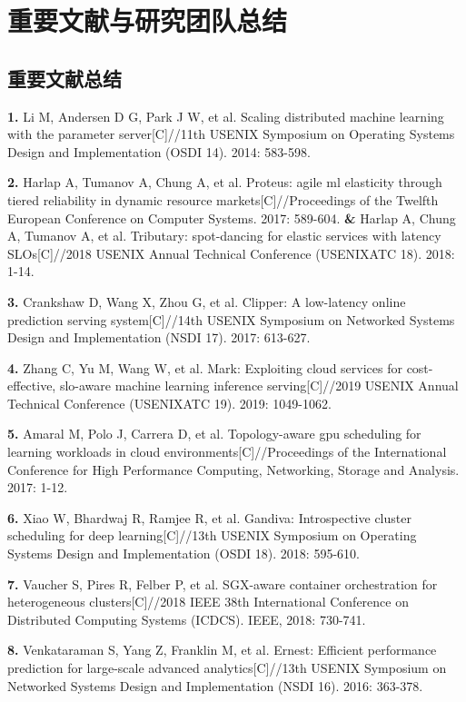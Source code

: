 \chapter{重要文献与研究团队总结}

\section{重要文献总结}
\textbf{1. }Li M, Andersen D G, Park J W, et al. Scaling distributed machine learning with the parameter server[C]//11th {USENIX} Symposium on Operating Systems Design and Implementation ({OSDI} 14). 2014: 583-598.

\textbf{2. }Harlap A, Tumanov A, Chung A, et al. Proteus: agile ml elasticity through tiered reliability in dynamic resource markets[C]//Proceedings of the Twelfth European Conference on Computer Systems. 2017: 589-604. \textbf{\&} Harlap A, Chung A, Tumanov A, et al. Tributary: spot-dancing for elastic services with latency SLOs[C]//2018 {USENIX} Annual Technical Conference ({USENIX}{ATC} 18). 2018: 1-14.

\textbf{3. }Crankshaw D, Wang X, Zhou G, et al. Clipper: A low-latency online prediction serving system[C]//14th {USENIX} Symposium on Networked Systems Design and Implementation ({NSDI} 17). 2017: 613-627.

\textbf{4. }Zhang C, Yu M, Wang W, et al. Mark: Exploiting cloud services for cost-effective, slo-aware machine learning inference serving[C]//2019 {USENIX} Annual Technical Conference ({USENIX}{ATC} 19). 2019: 1049-1062.

\textbf{5. }Amaral M, Polo J, Carrera D, et al. Topology-aware gpu scheduling for learning workloads in cloud environments[C]//Proceedings of the International Conference for High Performance Computing, Networking, Storage and Analysis. 2017: 1-12.

\textbf{6. }Xiao W, Bhardwaj R, Ramjee R, et al. Gandiva: Introspective cluster scheduling for deep learning[C]//13th {USENIX} Symposium on Operating Systems Design and Implementation ({OSDI} 18). 2018: 595-610.

\textbf{7. }Vaucher S, Pires R, Felber P, et al. SGX-aware container orchestration for heterogeneous clusters[C]//2018 IEEE 38th International Conference on Distributed Computing Systems (ICDCS). IEEE, 2018: 730-741.

\textbf{8. }Venkataraman S, Yang Z, Franklin M, et al. Ernest: Efficient performance prediction for large-scale advanced analytics[C]//13th {USENIX} Symposium on Networked Systems Design and Implementation ({NSDI} 16). 2016: 363-378.

